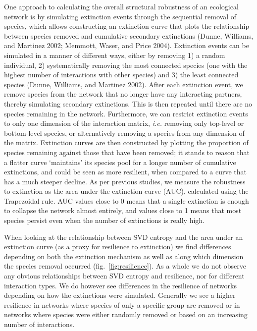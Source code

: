 \documentclass[10pt,oneside]{article}
\begin{document}
One approach to calculating the overall structural robustness of an
ecological network is by simulating extinction events through the
sequential removal of species, which allows constructing an extinction
curve that plots the relationship between species removed and cumulative
secondary extinctions (Dunne, Williams, and Martinez 2002; Memmott,
Waser, and Price 2004). Extinction events can be simulated in a manner
of different ways, either by removing 1) a random individual, 2)
systematically removing the most connected species (one with the highest
number of interactions with other species) and 3) the least connected
species (Dunne, Williams, and Martinez 2002). After each extinction
event, we remove species from the network that no longer have any
interacting partners, thereby simulating secondary extinctions. This is
then repeated until there are no species remaining in the network.
Furthermore, we can restrict extinction events to only one dimension of
the interaction matrix, \emph{i.e.} removing only top-level or
bottom-level species, or alternatively removing a species from any
dimension of the matrix. Extinction curves are then constructed by
plotting the proportion of species remaining against those that have
been removed; it stands to reason that a flatter curve `maintains' its
species pool for a longer number of cumulative extinctions, and could be
seen as more resilient, when compared to a curve that has a much steeper
decline. As per previous studies, we measure the robustness to
extinction as the area under the extinction curve (AUC), calculated
using the Trapezoidal rule. AUC values close to 0 means that a single
extinction is enough to collapse the network almost entirely, and values
close to 1 means that most species persist even when the number of
extinctions is really high.

When looking at the relationship between SVD entropy and the area under
an extinction curve (as a proxy for resilience to extinction) we find
differences depending on both the extinction mechanism as well as along
which dimension the species removal occurred
(fig.~\ref{fig:resilience}). As a whole we do not observe any obvious
relationships between SVD entropy and resilience, nor for different
interaction types. We do however see differences in the resilience of
networks depending on how the extinctions were simulated. Generally we
see a higher resilience in networks where species of only a specific
group are removed or in networks where species were either randomly
removed or based on an increasing number of interactions.
\end{document}
